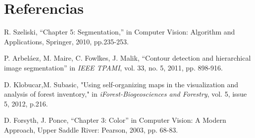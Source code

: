 \documentclass[10pt,twocolumn,letterpaper]{article}
\begin{document}
\section{\textbf{Referencias}}
\begin{enumerate}[label={[\arabic*]}]
\item R. Szeliski, “Chapter 5: Segmentation,” in Computer Vision: Algorithm and Applications, Springer, 2010, pp.235-253.\\
\item P. Arbeláez, M. Maire, C. Fowlkes, J. Malik, “Contour detection and hierarchical image segmentation” in  \textit{IEEE TPAMI}, vol. 33, no. 5, 2011, pp. 898-916.\\
\item D. Klobucar,M. Subasic, "Using self-organizing maps in the visualization and analysis of forest inventory," in \textit{iForest-Biogeosciences and Forestry}, vol. 5, issue 5, 2012, p.216.\\
\item D. Forsyth, J. Ponce, “Chapter 3: Color” in Computer Vision: A Modern Approach, Upper Saddle River: Pearson, 2003, pp. 68-83.\\

\end{enumerate}
\end{document}
